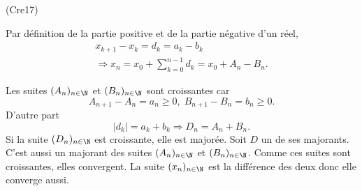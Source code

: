 \begin{tiny}(Cre17)\end{tiny} Par définition de la partie positive et de la partie négative d'un réel,
\begin{multline*}
  x_{k+1} - x_k = d_k = a_k - b_k \\
  \Rightarrow
  x_n = x_0 + \sum_{k=0}^{n-1}d_k 
  = x_0 + A_n - B_n.
\end{multline*}

Les suites $(A_n)_{n\in \N}$ et $(B_n)_{n\in \N}$ sont croissantes car 
\[
  A_{n+1} - A_n = a_n \geq 0, \; B_{n+1} - B_n = b_n \geq 0.
\]
D'autre part 
\[
  |d_k| = a_k + b_k \Rightarrow D_n = A_n + B_n.
\]
Si la suite $(D_n)_{n\in \N}$ est croissante, elle est majorée. Soit $D$ un de ses majorants. C'est aussi un majorant des suites $(A_n)_{n\in \N}$ et $(B_n)_{n\in \N}$. Comme ces suites sont croissantes, elles convergent. La suite $(x_n)_{n\in \N}$ est la différence des deux donc elle converge aussi.
